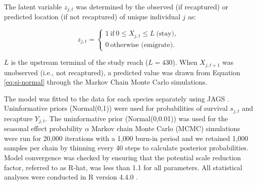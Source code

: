 \documentclass[11pt, class=article, crop=false]{standalone}
\begin{document}
The latent variable $z_{j,t}$ was determined by the observed (if recaptured) or predicted location (if not recaptured) of unique individual $j$ as: 

\begin{equation}
    z_{j,t} =
    \begin{cases}
        1~\text{if}~0 \le X_{j,t} \le L~\text{(stay)},\\
        0~\text{otherwise (emigrate)}.
    \end{cases}
\end{equation}

$L$ is the upstream terminal of the study reach ($L = 430$).
When $X_{j, t+1}$ was unobserved (i.e., not recaptured), a predicted value was drawn from Equation \ref{eq:si-normal} through the Markov Chain Monte Carlo simulations.






The model was fitted to the data for each species separately using JAGS \citep{JAGSJustAnother}. Uninformative priors (Normal(0,1)) were used for probabilities of survival $s_{j,t}$ and recapture $Y_{j,t}$. The uninformative prior (Normal(0,0.01)) was used for the seasonal effect probability $\alpha$ Markov chain Monte Carlo (MCMC) simulations were run for 20,000 iterations with a 1,000 burn-in period and we retained 1,000 samples per chain by thinning every 40 steps to calculate posterior probabilities. Model convergence was checked by ensuring that the potential scale reduction factor, referred to as R-hat, was less than 1.1 for all parameters. All statistical analyses were conducted in R version 4.4.0 \citep{CoreTeam2020}. 

\section{}




\end{document}
